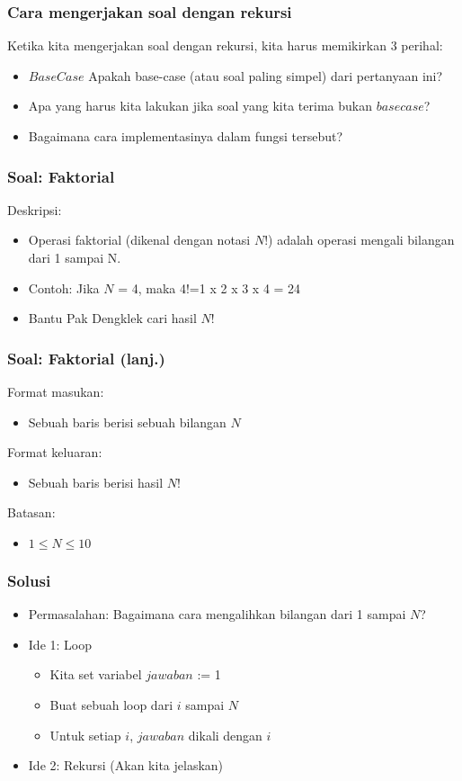 \begin{frame}
\frametitle{Cara mengerjakan soal dengan rekursi }
Ketika kita mengerjakan soal dengan rekursi, kita harus memikirkan 3 perihal:
\begin{itemize}
  \item $Base Case$ Apakah base-case (atau soal paling simpel) dari pertanyaan ini?
  \item Apa yang harus kita lakukan jika soal yang kita terima bukan $base case$?
  \item Bagaimana cara implementasinya dalam fungsi tersebut?
\end{itemize}
\end{frame}

\begin{frame}
\frametitle{Soal: Faktorial}
Deskripsi:
\begin{itemize}
  \item Operasi faktorial (dikenal dengan notasi $N$!) adalah operasi mengali bilangan dari 1 sampai N.
  \item Contoh: Jika $N$ = 4, maka 4!=1 x 2 x 3 x 4 = 24
  \item Bantu Pak Dengklek cari hasil $N$!
\end{itemize}
\end{frame}

\begin{frame}
\frametitle{Soal: Faktorial (lanj.) }
Format masukan:
\begin{itemize}
  \item Sebuah baris berisi sebuah bilangan $N$
\end{itemize}
Format keluaran:
\begin{itemize}
  \item Sebuah baris berisi hasil $N$!
\end{itemize}
Batasan:
\begin{itemize}
  \item $1 \le N \le 10$
\end{itemize}
\end{frame}

\begin{frame}
\frametitle{Solusi}
\begin{itemize}
  \item Permasalahan: Bagaimana cara mengalihkan bilangan dari 1 sampai $N$?
  \item Ide 1: Loop
    \begin{itemize}
      \item Kita set variabel $jawaban$ := 1
      \item Buat sebuah loop dari $i$ sampai $N$
      \item Untuk setiap $i$, $jawaban$ dikali dengan $i$
    \end{itemize}
  \item Ide 2: Rekursi (Akan kita jelaskan)
\end{itemize}
\end{frame}

